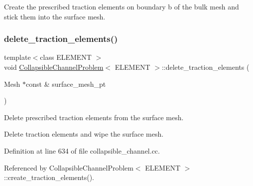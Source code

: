 Create the prescribed traction elements on boundary b of the bulk mesh and stick them into the surface mesh. \mbox{\label{classCollapsibleChannelProblem_a6a5324dd1efb8c517a7e4d431b10fca4}} 
\subsubsection{\texorpdfstring{delete\+\_\+traction\+\_\+elements()}{delete\_traction\_elements()}\hspace{0.1cm}{\footnotesize\ttfamily [1/2]}}
{\footnotesize\ttfamily template$<$class E\+L\+E\+M\+E\+NT $>$ \\
void \hyperlink{classCollapsibleChannelProblem}{Collapsible\+Channel\+Problem}$<$ E\+L\+E\+M\+E\+NT $>$\+::delete\+\_\+traction\+\_\+elements (\begin{DoxyParamCaption}\item[{Mesh $\ast$const \&}]{surface\+\_\+mesh\+\_\+pt }\end{DoxyParamCaption})\hspace{0.3cm}{\ttfamily [private]}}



Delete prescribed traction elements from the surface mesh. 

Delete traction elements and wipe the surface mesh. 

Definition at line 634 of file collapsible\+\_\+channel.\+cc.



Referenced by Collapsible\+Channel\+Problem$<$ E\+L\+E\+M\+E\+N\+T $>$\+::create\+\_\+traction\+\_\+elements().

\mbox{\label{classCollapsibleChannelProblem_a6a5324dd1efb8c517a7e4d431b10fca4}} 
